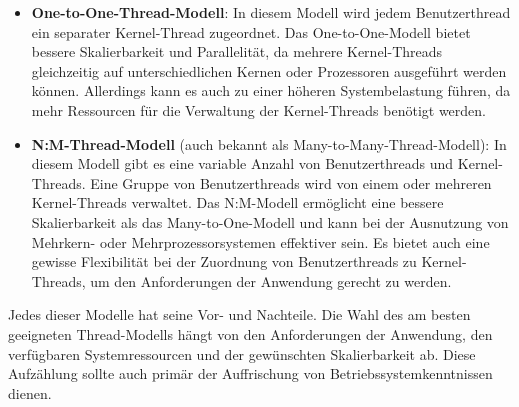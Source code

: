 \documentclass[../vs-script-first-v01.tex]{subfiles}
\begin{document}
\begin{itemize}
\item \textbf{One-to-One-Thread-Modell}: In diesem Modell wird jedem Benutzerthread ein separater Kernel-Thread zugeordnet. Das One-to-One-Modell bietet bessere Skalierbarkeit und Parallelität, da mehrere Kernel-Threads gleichzeitig auf unterschiedlichen Kernen oder Prozessoren ausgeführt werden können. Allerdings kann es auch zu einer höheren Systembelastung führen, da mehr Ressourcen für die Verwaltung der Kernel-Threads benötigt werden.
\item \textbf{N:M-Thread-Modell} (auch bekannt als Many-to-Many-Thread-Modell): In diesem Modell gibt es eine variable Anzahl von Benutzerthreads und Kernel-Threads. Eine Gruppe von Benutzerthreads wird von einem oder mehreren Kernel-Threads verwaltet. Das N:M-Modell ermöglicht eine bessere Skalierbarkeit als das Many-to-One-Modell und kann bei der Ausnutzung von Mehrkern- oder Mehrprozessorsystemen effektiver sein. Es bietet auch eine gewisse Flexibilität bei der Zuordnung von Benutzerthreads zu Kernel-Threads, um den Anforderungen der Anwendung gerecht zu werden.
\end{itemize}
Jedes dieser Modelle hat seine Vor- und Nachteile. Die Wahl des am besten geeigneten Thread-Modells hängt von den Anforderungen der Anwendung, den verfügbaren Systemressourcen und der gewünschten Skalierbarkeit ab. Diese Aufzählung sollte auch primär der Auffrischung von Betriebssystemkenntnissen dienen. \\\\
\end{document}
